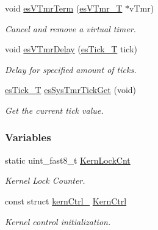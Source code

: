 \begin{DoxyCompactItemize}
void \hyperlink{group__kern__impl_gad6ec93a68e3526f18ed926cd441878cd}{es\-V\-Tmr\-Term} (\hyperlink{group__kern__vtmr_ga3c020f0ca54ff412bc1d1505502d2afc}{es\-V\-Tmr\-\_\-\-T} $\ast$v\-Tmr)
\begin{DoxyCompactList}\small\item\em Cancel and remove a virtual timer. \end{DoxyCompactList}\item 
void \hyperlink{group__kern__impl_ga26d10c6aaa0cd1d04261d2c9911e890d}{es\-V\-Tmr\-Delay} (\hyperlink{group__kern__vtmr_ga844873888c186ee81eb66620dadb0451}{es\-Tick\-\_\-\-T} tick)
\begin{DoxyCompactList}\small\item\em Delay for specified amount of ticks. \end{DoxyCompactList}\item 
\hyperlink{group__kern__vtmr_ga844873888c186ee81eb66620dadb0451}{es\-Tick\-\_\-\-T} \hyperlink{group__kern__impl_gacb0d88d6a7e467dc37a6a9a85945aaa6}{es\-Sys\-Tmr\-Tick\-Get} (void)
\begin{DoxyCompactList}\small\item\em Get the current tick value. \end{DoxyCompactList}\end{DoxyCompactItemize}
\subsubsection*{Variables}
\begin{DoxyCompactItemize}
\item 
static uint\-\_\-fast8\-\_\-t \hyperlink{group__kern__impl_gad8535f99414ea3e0e37a91fd6600246e}{Kern\-Lock\-Cnt}
\begin{DoxyCompactList}\small\item\em Kernel Lock Counter. \end{DoxyCompactList}\item 
const struct \hyperlink{structkernCtrl__}{kern\-Ctrl\-\_\-} \hyperlink{group__kern__impl_ga93a7ee7768ffd94201bf1795a543194b}{Kern\-Ctrl}
\begin{DoxyCompactList}\small\item\em Kernel control initialization. \end{DoxyCompactList}\end{DoxyCompactItemize}
